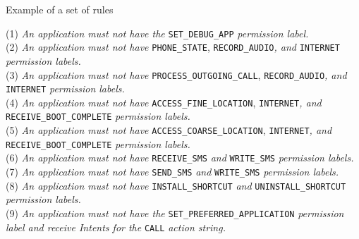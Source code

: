 \begin{frame}{Example of a set of rules}
\vspace*{-0.4cm}

\fontsize{9pt}{0}\selectfont
  (1) \textit{An application must not have the} \texttt{SET\_DEBUG\_APP}
  \textit{permission label.}\\ \vspace*{0.2cm}
  (2) \textit{An application must not have} \texttt{PHONE\_STATE},
  \texttt{RECORD\_AUDIO}\textit{, and }\texttt{INTERNET} \textit{permission
  labels.}\\ \vspace*{0.2cm}
  (3) \textit{An application must not have} \texttt{PROCESS\_OUTGOING\_CALL},
  \texttt{RECORD\_AUDIO}\textit{, and }\texttt{INTERNET} \textit{permission
  labels.}\\ \vspace*{0.2cm}
  (4) \textit{An application must not have} \texttt{ACCESS\_FINE\_LOCATION},
  \texttt{INTERNET}\textit{, and} \texttt{RECEIVE\_BOOT\_COMPLETE}
  \textit{permission labels.}\\ \vspace*{0.2cm}
  (5) \textit{An application must not have} \texttt{ACCESS\_COARSE\_LOCATION},
  \texttt{INTERNET}\textit{, and} \texttt{RECEIVE\_BOOT\_COMPLETE}
  \textit{permission labels.}\\ \vspace*{0.2cm}
  (6) \textit{An application must not have} \texttt{RECEIVE\_SMS} \textit{and}
  \texttt{WRITE\_SMS} \textit{permission labels.}\\ \vspace*{0.2cm}
  (7) \textit{An application must not have} \texttt{SEND\_SMS} \textit{and}
  \texttt{WRITE\_SMS} \textit{permission labels.}\\ \vspace*{0.2cm}
  (8) \textit{An application must not have} \texttt{INSTALL\_SHORTCUT}
  \textit{and} \texttt{UNINSTALL\_SHORTCUT} \textit{permission labels.}
  \\ \vspace*{0.2cm}
  (9) \textit{An application must not have the}
  \texttt{SET\_PREFERRED\_APPLICATION} \textit{permission label and receive
  Intents for the} \texttt{CALL} \textit{action string.}\\ \vspace*{0.2cm}
\fontsize{25pt}{7.2}\selectfont

\end{frame}

